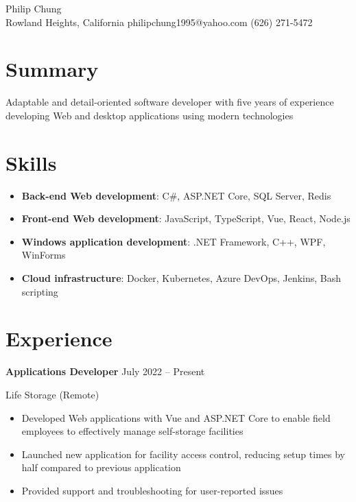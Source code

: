\documentclass[12pt]{article}
\newcommand{\titleheader}[2]{\textbf{#1} \symbol{"B7} #2}
\newcommand{\locheader}[2]{#1 (#2)}
\begin{document}
	\begin{center}
		{ Philip Chung} \\ \vspace{0.5em}
		Rowland Heights, California  philipchung1995@yahoo.com  (626) 271-5472
	\end{center}

	\section*{Summary}

	Adaptable and detail-oriented software developer with five years of experience developing Web and desktop applications using modern technologies

	\section*{Skills}

	\newcommand{\skillitem}[2]{\item \textbf{#1}: #2}

	\begin{itemize}
		\skillitem{Back-end Web development}{C\#, ASP.NET Core, SQL Server, Redis}
		\skillitem{Front-end Web development}{JavaScript, TypeScript, Vue, React, Node.js}
		\skillitem{Windows application development}{.NET Framework, C++, WPF, WinForms}
		\skillitem{Cloud infrastructure}{Docker, Kubernetes, Azure DevOps, Jenkins, Bash scripting}
	\end{itemize}

	\section*{Experience}

	\titleheader{Applications Developer}{July 2022 -- Present}

	\locheader{Life Storage}{Remote}

	\begin{itemize}
		\item Developed Web applications with Vue and ASP.NET Core to enable field employees to effectively manage self-storage facilities
		\item Launched new application for facility access control, reducing setup times by half compared to previous application
		\item Provided support and troubleshooting for user-reported issues
	\end{itemize}
\end{document}
